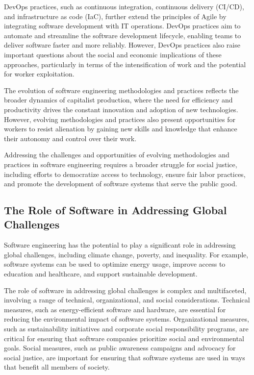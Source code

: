 \begin{refsection}
\begin{multicols}{2}
{DevOps practices, such as continuous integration, continuous delivery (CI/CD), and infrastructure as code (IaC), further extend the principles of Agile by integrating software development with IT operations. DevOps practices aim to automate and streamline the software development lifecycle, enabling teams to deliver software faster and more reliably. However, DevOps practices also raise important questions about the social and economic implications of these approaches, particularly in terms of the intensification of work and the potential for worker exploitation.

The evolution of software engineering methodologies and practices reflects the broader dynamics of capitalist production, where the need for efficiency and productivity drives the constant innovation and adoption of new technologies. However, evolving methodologies and practices also present opportunities for workers to resist alienation by gaining new skills and knowledge that enhance their autonomy and control over their work.

Addressing the challenges and opportunities of evolving methodologies and practices in software engineering requires a broader struggle for social justice, including efforts to democratize access to technology, ensure fair labor practices, and promote the development of software systems that serve the public good.

\subsection{The Role of Software in Addressing Global Challenges}

Software engineering has the potential to play a significant role in addressing global challenges, including climate change, poverty, and inequality. For example, software systems can be used to optimize energy usage, improve access to education and healthcare, and support sustainable development.

The role of software in addressing global challenges is complex and multifaceted, involving a range of technical, organizational, and social considerations. Technical measures, such as energy-efficient software and hardware, are essential for reducing the environmental impact of software systems. Organizational measures, such as sustainability initiatives and corporate social responsibility programs, are critical for ensuring that software companies prioritize social and environmental goals. Social measures, such as public awareness campaigns and advocacy for social justice, are important for ensuring that software systems are used in ways that benefit all members of society.

}
\end{multicols}
\end{refsection}
